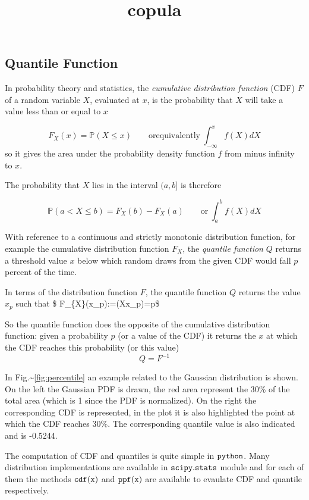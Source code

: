 \documentclass[11pt]{article}
\title{copula}
\def\lt{<}
\begin{document}
    
    \maketitle
    
    

    
    \hypertarget{quantile-function}{%
\subsection{Quantile Function}\label{quantile-function}}

In probability theory and statistics, the \emph{cumulative distribution
function} (CDF) \(F\) of a random variable \(X\), evaluated at \(x\), is
the probability that \(X\) will take a value less than or equal to \(x\)

\[F_X(x) = \mathbb{P}(X \le x)\qquad\mathrm{or equivalently}~\int_{-\infty}^{x}{f(X)dX}\]
so it gives the area under the probability density function \(f\) from
minus infinity to \(x\).

The probability that \(X\) lies in the interval \((a,b]\) is therefore

\[\mathbb{P}(a\lt X \le b)=F_{X}(b)-F_{X}(a)\qquad\mathrm{or}~\int_a^b{f(X)dX}\]

With reference to a continuous and strictly monotonic distribution
function, for example the cumulative distribution function \(F_X\), the
\emph{quantile function} \(Q\) returns a threshold value \(x\) below
which random draws from the given CDF would fall \(p\) percent of the
time.

In terms of the distribution function \(F\), the quantile function \(Q\)
returns the value \(x_p\) such that \$
F\_\{X\}(x\_p):=(X\le x\_p)=p\$

So the quantile function does the opposite of the cumulative
distribution function: given a probability \(p\) (or a value of the CDF)
it returns the \(x\) at which the CDF reaches this probability (or this
value) \[Q=F^{-1}\]

In Fig.\textasciitilde{}\ref{fig:percentile} an example related to the
Gaussian distribution is shown. On the left the Gaussian PDF is drawn,
the red area represent the 30\% of the total area (which is 1 since the
PDF is normalized). On the right the corresponding CDF is represented,
in the plot it is also highlighted the point at which the CDF reaches
30\%. The corresponding quantile value is also indicated and is -0.5244.

The computation of CDF and quantiles is quite simple in \(\tt{python}\).
Many distribution implementations are available in \(\tt{scipy.stats}\)
module and for each of them the methods \(\tt{cdf(x)}\) and
\(\tt{ppf(x)}\) are available to evaulate CDF and quantile respectively.
\end{document}

